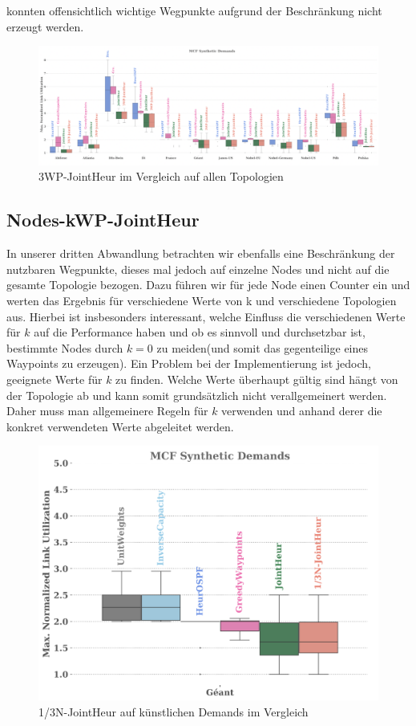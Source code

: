 konnten offensichtlich wichtige Wegpunkte aufgrund der Beschränkung nicht erzeugt werden.
\begin{figure}[h]
  \centering
  \includegraphics[width=\linewidth]{abbildungen/allTopologieskwp}
  \caption{3WP-JointHeur im Vergleich auf allen Topologien}
\end{figure}

\subsection{Nodes-kWP-JointHeur}
In unserer dritten Abwandlung betrachten wir ebenfalls eine Beschränkung der nutzbaren Wegpunkte, dieses mal jedoch auf einzelne Nodes und nicht auf die gesamte Topologie bezogen.
Dazu führen wir für jede Node einen Counter ein und werten das Ergebnis für verschiedene Werte von k und verschiedene Topologien aus. Hierbei ist insbesonders interessant, welche Einfluss die verschiedenen Werte für $k$ auf die Performance haben und ob es sinnvoll und durchsetzbar ist, bestimmte Nodes durch $k=0$ zu meiden(und somit das gegenteilige eines Waypoints zu erzeugen).
Ein Problem bei der Implementierung ist jedoch, geeignete Werte für $k$ zu finden. Welche Werte überhaupt gültig sind hängt von der Topologie ab und kann somit grundsätzlich nicht verallgemeinert werden. Daher muss man allgemeinere Regeln für $k$ verwenden und anhand derer die konkret verwendeten Werte abgeleitet werden.

\begin{figure}[h]
  \centering
  \includegraphics[width=\linewidth]{abbildungen/a31}
  \caption{1/3N-JointHeur auf künstlichen Demands im Vergleich}
\end{figure}


